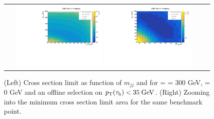 \begin{figure}[tbh!]
	\centering
	\begin{tabular}{cc}
		\includegraphics[width=0.45\textwidth]{analysis/pics/JetInvMass_vs_MET_xsec_chi300_lsp000_taupt35.pdf}
		\includegraphics[width=0.45\textwidth]{analysis/pics/JetInvMass_vs_MET_xsec_chi300_lsp000_taupt35_zoom.pdf} 		
	\end{tabular}
	\caption{(Left) Cross section limit as function of $m_{jj}$ and \met for \charginopm = \neutralinotwo = 300 GeV, \neutralinoone = 0 GeV and an offline selection on $p_{\text{T}}(\tau_{\text{h}}) <  35\;\text{Ge}\kern-0.06667em\text{V}$. (Right) Zooming into the minimum cross section limit area for the same benchmark point.}
	\label{fig::JetInvMass_vs_MET_xsec_chi300_lsp000_taupt35}
\end{figure}

